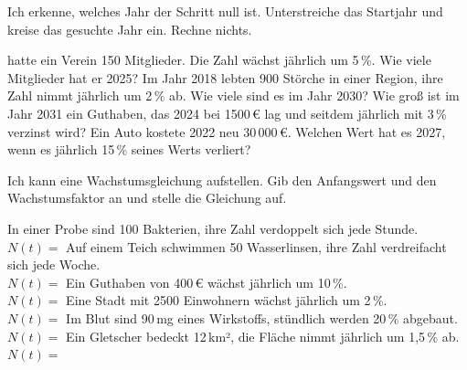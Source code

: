 \setcounter{aufgabe}{39}

\begin{aufgabe}{Ich erkenne, welches Jahr der Schritt null ist.}
Unterstreiche das Startjahr und kreise das gesuchte Jahr ein. Rechne nichts.
\begin{teile}
 hatte ein Verein 150 Mitglieder. Die Zahl wächst jährlich um 5\,\%. Wie viele Mitglieder hat er 2025?
\teil Im Jahr 2018 lebten 900 Störche in einer Region, ihre Zahl nimmt jährlich um 2\,\% ab. Wie viele sind es im Jahr 2030?
\teil Wie groß ist im Jahr 2031 ein Guthaben, das 2024 bei 1500\,€ lag und seitdem jährlich mit 3\,\% verzinst wird?
\teil Ein Auto kostete 2022 neu 30\,000\,€. Welchen Wert hat es 2027, wenn es jährlich 15\,\% seines Werts verliert?
\end{teile}
\end{aufgabe}


\begin{aufgabe}{Ich kann eine Wachstumsgleichung aufstellen.}
Gib den Anfangswert und den Wachstumsfaktor an und stelle die Gleichung auf.
\begin{teile}
\teil In einer Probe sind 100 Bakterien, ihre Zahl verdoppelt sich jede Stunde. \\  \quad {} \quad $N(t) = $ \leerfeld
\teil Auf einem Teich schwimmen 50 Wasserlinsen, ihre Zahl verdreifacht sich jede Woche. \\  \quad {} \quad $N(t) = $ \leerfeld
\teil Ein Guthaben von 400\,€ wächst jährlich um 10\,\%. \\  \quad {} \quad $N(t) = $ \leerfeld
\teil Eine Stadt mit 2500 Einwohnern wächst jährlich um 2\,\%. \\  \quad {} \quad $N(t) = $ \leerfeld
\teil Im Blut sind 90\,mg eines Wirkstoffs, stündlich werden 20\,\% abgebaut. \\  \quad {} \quad $N(t) = $ \leerfeld
\teil Ein Gletscher bedeckt 12\,km², die Fläche nimmt jährlich um 1,5\,\% ab. \\  \quad {} \quad $N(t) = $ \leerfeld
\end{teile}
\end{aufgabe}

